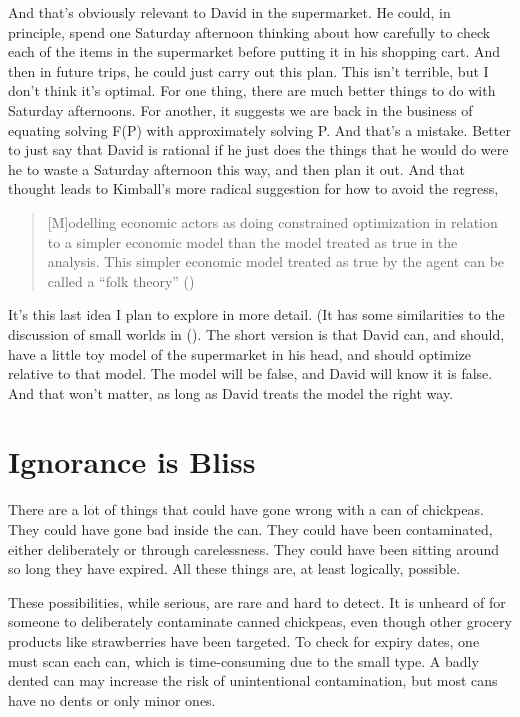 \documentclass[
  12pt,
  letterpaper,
]{scrbook}
\begin{document}
And that's obviously relevant to David in the supermarket. He could, in
principle, spend one Saturday afternoon thinking about how carefully to
check each of the items in the supermarket before putting it in his
shopping cart. And then in future trips, he could just carry out this
plan. This isn't terrible, but I don't think it's optimal. For one
thing, there are much better things to do with Saturday afternoons. For
another, it suggests we are back in the business of equating solving
F(P) with approximately solving P. And that's a mistake. Better to just
say that David is rational if he just does the things that he would do
were he to waste a Saturday afternoon this way, and then plan it out.
And that thought leads to Kimball's more radical suggestion for how to
avoid the regress,

\begin{quote}
{[}M{]}odelling economic actors as doing constrained optimization in
relation to a simpler economic model than the model treated as true in
the analysis. This simpler economic model treated as true by the agent
can be called a ``folk theory'' ()
\end{quote}

It's this last idea I plan to explore in more detail. (It has some
similarities to the discussion of small worlds in
(). The short version
is that David can, and should, have a little toy model of the
supermarket in his head, and should optimize relative to that model. The
model will be false, and David will know it is false. And that won't
matter, as long as David treats the model the right way.

\section{Ignorance is Bliss}\label{sec-ignorancebliss}

There are a lot of things that could have gone wrong with a can of
chickpeas. They could have gone bad inside the can. They could have been
contaminated, either deliberately or through carelessness. They could
have been sitting around so long they have expired. All these things
are, at least logically, possible.

These possibilities, while serious, are rare and hard to detect. It is
unheard of for someone to deliberately contaminate canned chickpeas,
even though other grocery products like strawberries have been targeted.
To check for expiry dates, one must scan each can, which is
time-consuming due to the small type. A badly dented can may increase
the risk of unintentional contamination, but most cans have no dents or
only minor ones.
\end{document}
